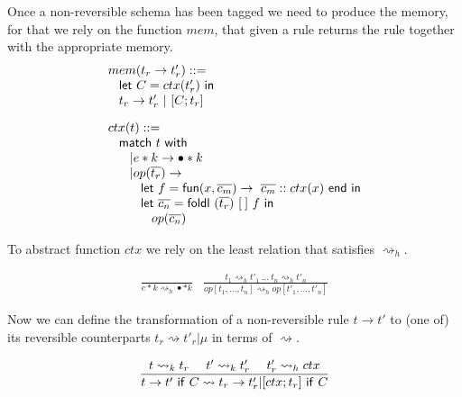 \documentclass{article}[12pt,a4paper]
\theoremstyle{definition}
\begin{document}
Once a non-reversible schema has been tagged we need to produce the memory, for
that we rely on the function $mem$, that given a rule returns the rule together
with the appropriate memory.
\[
  \begin{array}{l}
  \begin{array}{l}
    mem(t_r \rightarrow t'_r) ::=\\
    \hspace{2ex}\mathsf{let}~C=ctx(t'_r)~\mathsf{in}\\
    \hspace{2ex}t_r \rightarrow t'_r~|~[C;t_r]
  \end{array}\\[5ex]
  
  \begin{array}{l}
    ctx(t)::=\\
    \hspace{2ex}\mathsf{match}~t~\mathsf{with}\\
    \hspace{4ex}| e*k \rightarrow \bullet * k\\
    \hspace{4ex}| op(\overline{t_r}) \rightarrow \\
    \hspace{6ex} \mathsf{let}~f=\mathsf{fun}(x,\overline{c_m})\rightarrow~\overline{c_m}::ctx(x)~\mathsf{end}~\mathsf{in}\\
    \hspace{6ex}\mathsf{let}~\overline{c_n} =
    \mathsf{foldl}~(\overline{t_r})~[\:]~f~\mathsf{in}\\
    \hspace{8ex} op(\overline{c_n})
  \end{array}
  \end{array}
\]

To abstract function $ctx$ we rely on the least relation that satisfies
$\rightsquigarrow_h$.

\[
  \begin{array}{ll}
    \displaystyle
    \frac{}
    { e * k \rightsquigarrow_h \bullet * k }
    &
      \displaystyle
      \frac{t_1 \rightsquigarrow_h t'_1~\ldots~t_n\rightsquigarrow_h t'_n}
      { op[t_1,\ldots,t_n] \rightsquigarrow_h op[t'_1,\ldots,t'_n] }
  \end{array}
\]

Now we can define the transformation of a non-reversible rule $t\rightarrow t'$
to (one of) its reversible counterparts $t_r \rightsquigarrow t'_r|\mu$ in terms of
$\rightsquigarrow$.

\[
  \frac{t\rightsquigarrow_k t_r~~~~t'\rightsquigarrow_k t'_r~~~~t'_r\rightsquigarrow_h ctx}{
    t\rightarrow t'~\mathsf{if}~C \rightsquigarrow t_r \rightarrow t'_r|[ctx; t_r]~\mathsf{if}~C 
  }
\]
\end{document}
